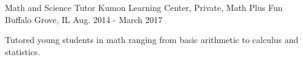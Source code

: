 \begin{cventries}
    \cventry
    {Math and Science Tutor}
    {Kumon Learning Center, Private, Math Plus Fun}
    {Buffalo Grove, IL}
    {Aug. 2014 - March 2017}
    {
      \begin{cvitems}
        \item {Tutored young students in math ranging from basic arithmetic to calculus and statistics.}
      \end{cvitems}
    }
\end{cventries}
